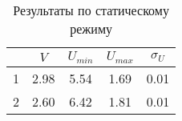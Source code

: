 \begin{table}[]
    \centering
    \begin{tabular}{|c|c|c|c|c|}
    \hline
      & $V$    & $U_{min}$ & $U_{max}$ & $\sigma_U$ \\ \hline
    1 & 2.98   & 5.54      & 1.69      & 0.01       \\ \hline
    2 & 2.60   & 6.42      & 1.81      & 0.01       \\ \hline
    \end{tabular}
    \caption{Результаты по статическому режиму}
    \label{tab:static_mod}
\end{table}
